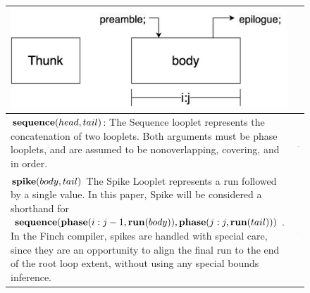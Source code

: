 \begin{figure}[ht]
\begin{tabular} {|l|c|}
    \begin{minipage}[c]{0.35\linewidth}
        \centering
        \includegraphics[scale=0.20]{Looplets-thunk.png}
    \end{minipage} \\ \hline
    \begin{minipage}[c]{0.65\linewidth}
        $\text{\textbf{sequence}}(head, tail)$: The Sequence looplet represents the
        concatenation of two looplets. Both arguments must be phase looplets, and
        are assumed to be nonoverlapping, covering, and in order.
    \end{minipage} &
    \begin{minipage}[c]{0.35\linewidth}
        \centering
        \includegraphics[scale=0.20]{Looplets-sequence.png}
    \end{minipage} \\ \hline
    \begin{minipage}[c]{0.65\linewidth}
        $\text{\textbf{spike}}(body, tail)$ The Spike Looplet represents a run
        followed by a single value. In this paper, Spike will be considered a
        shorthand for $\text{\textbf{sequence}}(\text{\textbf{phase}}(i:j-1, \text{\textbf{run}}(body)),
        \text{\textbf{phase}}(j:j, \text{\textbf{run}}(tail)))$.  In the Finch compiler, spikes are
        handled with special care, since they are an opportunity to align the
        final run to the end of the root loop extent, without using any special
        bounds inference.
    \end{minipage} &
    \begin{minipage}[c]{0.35\linewidth}
        \centering
        \includegraphics[scale=0.20]{Looplets-spike.png}

\end{minipage}
\end{tabular}
\end{figure}
